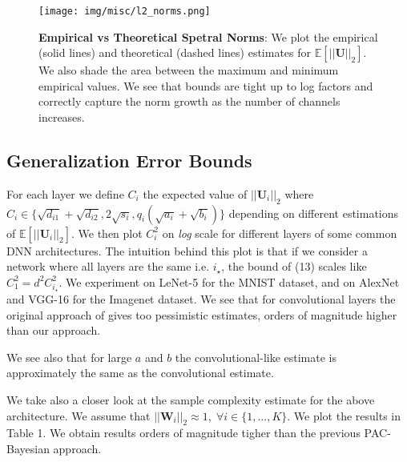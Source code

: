 \documentclass{article} %
\theoremstyle{definition}
\begin{document}
\begin{figure}[h!]
\centering
\texttt{[image: img/misc/l2\_norms.png]}
\caption{\textbf{Empirical vs Theoretical Spetral Norms}: We plot the empirical (solid lines) and theoretical (dashed lines) estimates for $\mathbb{E}[ ||\boldsymbol{U}||_2 ]$. We also shade the area between the maximum and minimum empirical values. We see that bounds are tight up to log factors and correctly capture the norm growth as the number of channels increases. }
\end{figure} 

\subsection{Generalization Error Bounds}
For each layer we define $C_i$ the expected value of $||\boldsymbol{U}_i||_2$ where $C_i \in \{ \sqrt{d_{i1}}+\sqrt{d_{i2}}, 2\sqrt{s_i} , q_i(\sqrt{a_i}+\sqrt{b_i}) \}$ depending on different estimations of $\mathbb{E}[ ||\boldsymbol{U}_i||_2 ]$. We then plot $C_i^2$ on \textit{log} scale for different layers of some common DNN architectures. The intuition behind this plot is that if we consider a network where all layers are the same i.e. $i_{\star}$, the bound of (13) scales like $C_1^2 = d^2C_{i_{\star}}^2$. We experiment on LeNet-5 for the MNIST dataset, and on AlexNet and VGG-16 for the Imagenet dataset. We see that for convolutional layers the original approach of \citet{neyshabur2017pac} gives too pessimistic estimates, orders of magnitude higher than our approach. 

We see also that for large $a$ and $b$ the convolutional-like estimate is approximately the same as the convolutional estimate. %

We take also a closer look at the sample complexity estimate for the above architecture. We assume that $||\boldsymbol{W}_i||_2 \approx 1 , \; \forall i \in \{1,...,K\}$. We plot the results in Table 1. We obtain results orders of magnitude tigher than the previous PAC-Bayesian approach.
\end{document}

